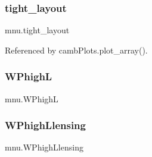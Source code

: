 \subsubsection{\texorpdfstring{tight\+\_\+layout}{tight\_layout}}
{\footnotesize\ttfamily mnu.\+tight\+\_\+layout}



Referenced by camb\+Plots.\+plot\+\_\+array().

\mbox{\label{namespacemnu_afea9ed84723cd13f4ba621f47d1196e5}} 
\subsubsection{\texorpdfstring{W\+PhighL}{WPhighL}}
{\footnotesize\ttfamily mnu.\+W\+PhighL}

\mbox{\label{namespacemnu_af1c753bc1e12c8705292f14340cf3499}} 
\subsubsection{\texorpdfstring{W\+Phigh\+Llensing}{WPhighLlensing}}
{\footnotesize\ttfamily mnu.\+W\+Phigh\+Llensing}

